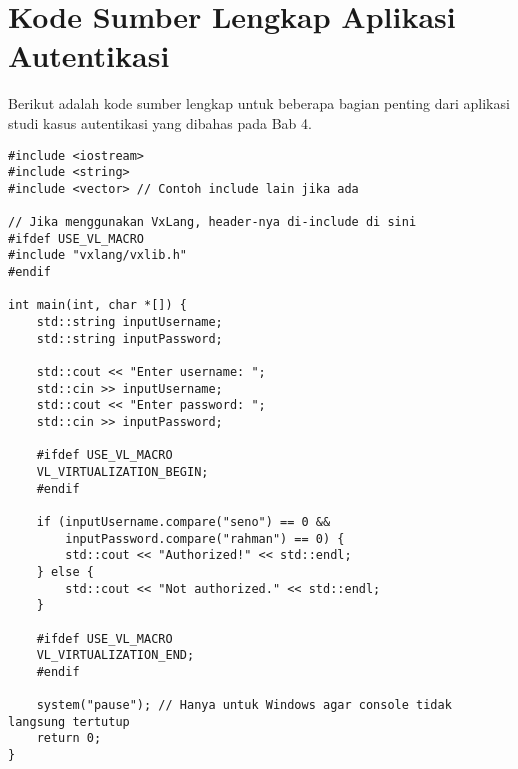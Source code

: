 \chapter*{Kode Sumber Lengkap Aplikasi Autentikasi}
\label{app:kode_sumber} %

Berikut adalah kode sumber lengkap untuk beberapa bagian penting dari aplikasi studi kasus autentikasi yang dibahas pada Bab 4.


\begin{verbatim}
#include <iostream>
#include <string>
#include <vector> // Contoh include lain jika ada

// Jika menggunakan VxLang, header-nya di-include di sini
#ifdef USE_VL_MACRO
#include "vxlang/vxlib.h"
#endif

int main(int, char *[]) {
    std::string inputUsername;
    std::string inputPassword;

    std::cout << "Enter username: ";
    std::cin >> inputUsername;
    std::cout << "Enter password: ";
    std::cin >> inputPassword;

    #ifdef USE_VL_MACRO
    VL_VIRTUALIZATION_BEGIN;
    #endif

    if (inputUsername.compare("seno") == 0 &&
        inputPassword.compare("rahman") == 0) {
        std::cout << "Authorized!" << std::endl;
    } else {
        std::cout << "Not authorized." << std::endl;
    }

    #ifdef USE_VL_MACRO
    VL_VIRTUALIZATION_END;
    #endif

    system("pause"); // Hanya untuk Windows agar console tidak langsung tertutup
    return 0;
}
    \end{verbatim}
\label{lst:console_hardcoded_full}

